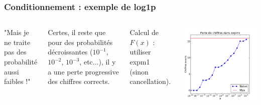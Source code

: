 \documentclass{beamer}
\begin{document}
\begin{frame}[containsverbatim]
\frametitle{Conditionnement : exemple de log1p}

  \begin{columns}

"Mais je ne traite pas des probabilité aussi faibles !" 

Certes, il reste que pour des probabilités décroissantes ($10^{-1}$, 
$10^{-2}$, $10^{-3}$, etc...),
il y a une perte progressive des chiffres corrects.

Calcul de $F(x)$ : utiliser \textrm{expm1} (sinon cancellation).


\begin{center}
\includegraphics[width=1.0\textwidth]{expinv-perte}
\end{center}

  \end{columns}

\end{frame}

\end{document}
